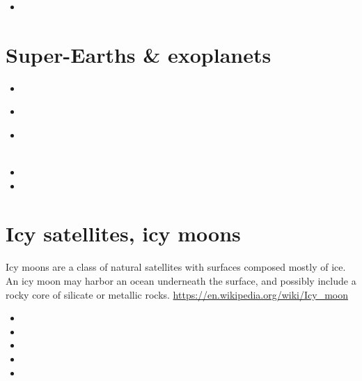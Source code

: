 \begin{scriptsize}
\begin{itemize}
\item[\twothousandsixteen] 
\end{itemize}
\end{scriptsize}

\section{Super-Earths \& exoplanets}

\begin{scriptsize}
\begin{itemize}
\item[\twothousandeleven]
  \\
\item[\twothousandthirteen]
\item[\twothousandfifteen] 
  \\
  \\
\item[\twothousandtwentyone]
\item[\twothousandtwentythree] 
\end{itemize}
\end{scriptsize}

\section{Icy satellites, icy moons}

Icy moons are a class of natural satellites with surfaces composed mostly of ice. 
An icy moon may harbor an ocean underneath the surface, and possibly include a rocky 
core of silicate or metallic rocks.
\url{https://en.wikipedia.org/wiki/Icy_moon}

\begin{scriptsize}
\begin{itemize}
\item[\twothousandone] 
\item[\twothousandtwelve] 
\item[\twothousandseventeen] 
\item[\twothousandnineteen] 
\item[\twothousandtwenty] 
\end{itemize}
\end{scriptsize}

